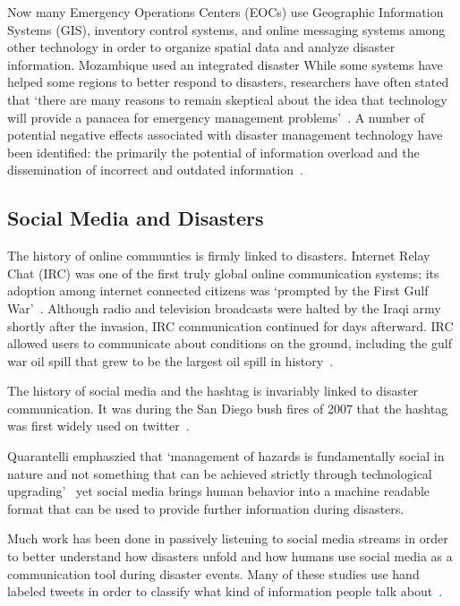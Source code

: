 Now many Emergency Operations Centers (EOCs) use Geographic Information Systems
(GIS), inventory control systems, and online messaging systems among other
technology in order to organize spatial data and analyze disaster information.
Mozambique used an integrated disaster 
While some systems have helped some regions to better respond to disasters,
researchers have often stated that `there are many reasons to remain skeptical
about the idea that technology will provide a panacea for emergency management
problems'~\cite{tzemosUseGISFederal1995, tierneyFacingUnexpectedDisaster2001,
perryNaturalDisasterManagement2007}. A number of potential negative effects
associated with disaster management technology have been identified: the
primarily the potential of information overload and the dissemination of
incorrect and outdated
information~\cite{quarantelliProblematicalAspectsInformation1997,
flentgeDesigningContextAwareHCI}.



\subsection{Social Media and Disasters}
The history of online communties is firmly linked to disasters. Internet
Relay Chat (IRC) was one of the first truly global online communication systems;
its adoption among internet connected citizens was `prompted by the First Gulf
War'~\cite{salazarHashtagsAnnotatedHistory2017}. Although radio and
television broadcasts were halted by the Iraqi army shortly after the invasion,
IRC communication continued for days afterward. IRC allowed users to communicate
about conditions on the ground, including the gulf war oil spill that grew to be
the largest oil spill in history~\cite{Timeline20Years2010}.

The history of social media and the hashtag is invariably linked to disaster
communication.  It was during the San Diego bush fires of 2007 that the hashtag
was first widely used on twitter~\cite{salazarHashtagsAnnotatedHistory2017}.

Quarantelli emphaszied that  `management of hazards is fundamentally social in
nature and not something that can be achieved strictly through technological
upgrading'~\cite{tierneyFacingUnexpectedDisaster2001} yet social media brings
human behavior into a machine readable format that can be used to provide
further information during disasters.

Much work has been done in passively listening to social media streams in order
to better understand how disasters unfold and how humans use social media as a
communication tool during disaster events. Many of these studies use hand
labeled tweets in order to classify what kind of information people talk
about~\cite{alamTwitterTaleThree2018}.

